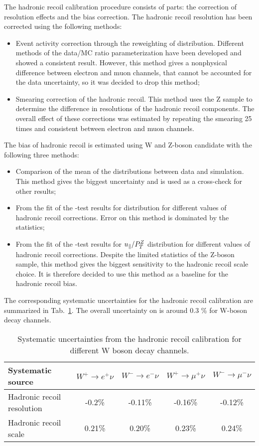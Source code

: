 The hadronic recoil calibration procedure consists of parts: the correction of resolution effects and the bias correction. 
The hadronic recoil resolution has been corrected using the following methods:
\begin{itemize}
\item Event activity correction through the reweighting of \sumet distribution. Different methods of the data/MC ratio parameterization have been developed and showed a consistent result. However, this method gives a nonphysical difference between electron and muon channels, that cannot be accounted for the data uncertainty, so it was decided to drop this method;
\item Smearing correction of the hadronic recoil. This method uses the Z sample to determine the difference in resolutions of the hadronic recoil components. The overall effect of these corrections was estimated by repeating the smearing 25 times and consistent between electron and muon channels.
\end{itemize}
The bias of hadronic recoil  is estimated using W and Z-boson candidate with the following three methods:
\begin{itemize}
\item Comparison of the mean of the \mtw distributions between data and simulation. This method gives the biggest uncertainty and is used as a cross-check for other results;
\item From the \chiD fit of the \chiD-test results for \mtw distribution for different values of hadronic recoil corrections. Error on this method is dominated by the statistics;
\item From the \chiD fit of the \chiD-test results for $u_{\parallel}/P_T^{Z}$ distribution for different values of hadronic recoil corrections. Despite the limited statistics of the Z-boson sample, this method gives the biggest sensitivity to the hadronic recoil scale choice. It is therefore decided to use this method as a baseline for the hadronic recoil bias.
\end{itemize}

The corresponding systematic uncertainties for the hadronic recoil calibration are summarized in Tab.~\ref{tab:SFHadronRecoilBias}. The overall uncertainty on \etmiss is around 0.3 \% for  W-boson decay channels.

\begin{table}[!tb]
\caption{Systematic uncertainties from the hadronic recoil calibration for different W boson decay channels.}
\label{tab:SFHadronRecoilBias}
\begin{center}
\begin{tabular}{| l || c | c | c | c |}
\hline
Systematic source & $W^{+} \to e^{+}\nu$ & $W^{-} \to e^{-}\nu$  & $W^{+} \to \mu^{+}\nu$ & $W^{-} \to \mu^{-}\nu$ \\
\hline
\hline
Hadronic recoil resolution & -0.2\% & -0.11\% & -0.16\% & -0.12\% \\
Hadronic recoil scale &  0.21\% & 0.20\% & 0.23\% & 0.24\% \\
\hline
\end{tabular}
\end{center}
\end{table}
